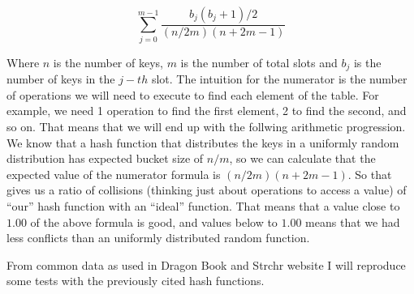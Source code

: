 \[ \sum_{j = 0}^{m - 1} \frac{b_j(b_j + 1)/2}{ (n/2m)(n + 2m - 1) } \]

Where \( n \) is the number of keys, \( m \) is the number of total slots and \( b_j \) is the number of keys in the \( j-th \) slot. The intuition for the numerator is the number of operations we will need to execute to find each element of the table. For example, we need 1 operation to find the first element, 2 to find the second, and so on. That means that we will end up with the follwing arithmetic progression. We know that a hash function that distributes the keys in a uniformly random distribution has expected bucket size of \( n / m \), so we can calculate that the expected value of the numerator formula is \( (n/2m)(n + 2m - 1) \). So that gives us a ratio of collisions (thinking just about operations to access a value) of ``our'' hash function with an ``ideal'' function. That means that a value close to \( 1.00 \) of the above formula is good, and values below to \( 1.00 \) means that we had less conflicts than an uniformly distributed random function.

From common data as used in Dragon Book and Strchr website \cite{DragonHashFunc} I will reproduce some tests with the previously cited hash functions.